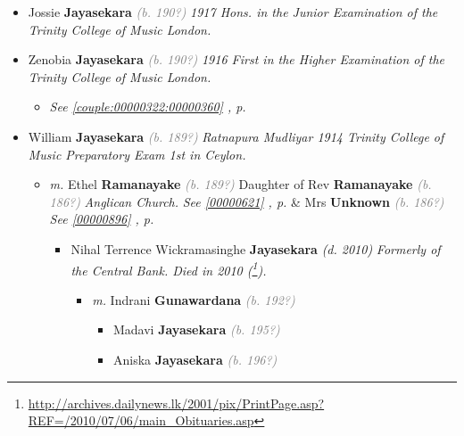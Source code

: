 \documentclass[10pt, openany]{book}
\begin{document}
\begin{itemize}
{\begin{itemize}
{ }
\item{Jossie \textbf{Jayasekara} \textcolor{gray}{\textit{(b. 190?)}} \textcolor{slmaroon}{\textit{1917 Hons. in the Junior Examination of the Trinity College of Music London.}}
 }
\item{Zenobia \textbf{Jayasekara} \textcolor{gray}{\textit{(b. 190?)}} \textcolor{slmaroon}{\textit{1916 First in the Higher Examination of the Trinity College of Music London.}}
\begin{itemize}
\item{\textcolor{slteal}{\textit{See  \autoref{couple:00000322:00000360} \textit{, p. \pageref{couple:00000322:00000360} }}}}
\end{itemize}
 }
\item{William \textbf{Jayasekara} \textcolor{gray}{\textit{(b. 189?)}} \textcolor{slmaroon}{\textit{Ratnapura Mudliyar 1914 Trinity College of Music Preparatory Exam 1st in Ceylon.}}
\begin{itemize}
\item{\textit{m.} Ethel \textbf{Ramanayake} \textcolor{gray}{\textit{(b. 189?)}} Daughter of  Rev \textbf{Ramanayake} \textcolor{gray}{\textit{(b. 186?)}} \textcolor{slmaroon}{\textit{Anglican Church.}} \textcolor{slteal}{\textit{See  \autoref{00000621} \textit{, p. \pageref{00000621} }}}  \&  Mrs \textbf{Unknown} \textcolor{gray}{\textit{(b. 186?)}} \textcolor{slteal}{\textit{See  \autoref{00000896} \textit{, p. \pageref{00000896} }}}   \label{couple:00000321:00000620} \begin{itemize}
\item{Nihal Terrence Wickramasinghe \textbf{Jayasekara} \textcolor{slorange}{\textit{(d. 2010)}} \textcolor{slmaroon}{\textit{Formerly of the Central Bank.
Died in 2010 (\footnote{\url{http://archives.dailynews.lk/2001/pix/PrintPage.asp?REF=/2010/07/06/main_Obituaries.asp}}).}}
\begin{itemize}
\item{\textit{m.} Indrani \textbf{Gunawardana} \textcolor{gray}{\textit{(b. 192?)}}   \label{couple:00000239:00000309} \begin{itemize}
\item{Madavi \textbf{Jayasekara} \textcolor{gray}{\textit{(b. 195?)}}
 }
\item{Aniska \textbf{Jayasekara} \textcolor{gray}{\textit{(b. 196?)}}
 }
\end{itemize}}

\end{itemize}}
\end{itemize}}
\end{itemize}}
\end{itemize}}
\end{itemize}
\end{document}
